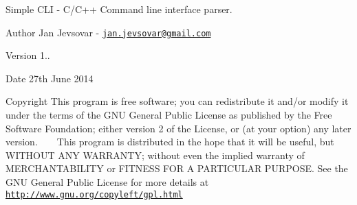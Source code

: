 Simple C\+L\+I -\/ C/\+C++ Command line interface parser.

\begin{DoxyAuthor}{Author}
Jan Jevsovar -\/ \href{mailto:jan.jevsovar@gmail.com}{\tt jan.\+jevsovar@gmail.\+com}
\end{DoxyAuthor}
\begin{DoxyVersion}{Version}
1.. 
\end{DoxyVersion}
\begin{DoxyDate}{Date}
27th June 2014
\end{DoxyDate}
\begin{DoxyCopyright}{Copyright}
This program is free software; you can redistribute it and/or modify it under the terms of the G\+N\+U General Public License as published by the Free Software Foundation; either version 2 of the License, or (at your option) any later version. ~\newline
 ~\newline
This program is distributed in the hope that it will be useful, but W\+I\+T\+H\+O\+U\+T A\+N\+Y W\+A\+R\+R\+A\+N\+T\+Y; without even the implied warranty of M\+E\+R\+C\+H\+A\+N\+T\+A\+B\+I\+L\+I\+T\+Y or F\+I\+T\+N\+E\+S\+S F\+O\+R A P\+A\+R\+T\+I\+C\+U\+L\+A\+R P\+U\+R\+P\+O\+S\+E. See the G\+N\+U General Public License for more details at \href{http://www.gnu.org/copyleft/gpl.html}{\tt http\+://www.\+gnu.\+org/copyleft/gpl.\+html} 
\end{DoxyCopyright}

